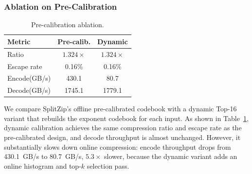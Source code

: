 \subsubsection{Ablation on Pre-Calibration}
\label{sec:ablation_precalibration}

\begin{table}
    \vspace{-1.2em}
    \centering
    \caption{Pre-calibration ablation.}
    \label{tab:ablation_precalibration}
    \scriptsize
    \setlength{\tabcolsep}{8pt}
    \renewcommand{\arraystretch}{1.08}
    \begin{tabular}{lcc}
        \toprule
        \textbf{Metric} & \textbf{Pre-calib.} & \textbf{Dynamic} \\
        \midrule
        Ratio & $1.324\times$ & $1.324\times$ \\
        Escape rate & 0.16\% & 0.16\% \\
        Encode(GB/s) & 430.1 & 80.7 \\
        Decode(GB/s) & 1745.1 & 1779.1 \\
        \bottomrule
    \end{tabular}
    \vspace{-1.5em}
\end{table}

We compare SplitZip's offline pre-calibrated codebook with a dynamic Top-16 variant that rebuilds the exponent codebook for each input.
As shown in Table~\ref{tab:ablation_precalibration}, dynamic calibration achieves the same compression ratio and escape rate as the pre-calibrated design, and decode throughput is almost unchanged.
However, it substantially slows down online compression: encode throughput drops from 430.1~GB/s to 80.7~GB/s, $5.3\times$ slower, because the dynamic variant adds an online histogram and top-$k$ selection pass.
